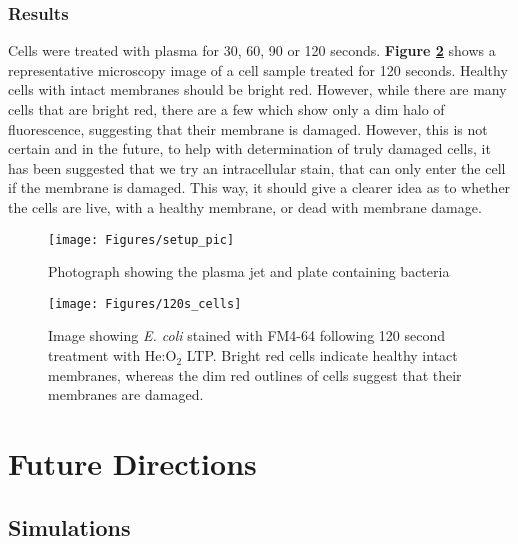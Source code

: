 \documentclass[11pt, oneside]{article}   	%
\newcommand{\todo}[1]{ \textcolor{red}{\bf{To Do:} #1}}
\begin{document}
\subsubsection{Results}
Cells were treated with plasma for 30, 60, 90 or 120 seconds.
\textbf{Figure \ref{fig:results}} shows a representative microscopy image of a cell sample treated for 120 seconds.
Healthy cells with intact membranes should be bright red.
However, while there are many cells that are bright red, there are a few which show only a dim halo of fluorescence, suggesting that their membrane is damaged.
However, this is not certain and in the future, to help with determination of truly damaged cells, it has been suggested that we try an intracellular stain, that can only enter the cell if the membrane is damaged.
This way, it should give a clearer idea as to whether the cells are live, with a healthy membrane, or dead with membrane damage.






\begin{figure}
\centering
\texttt{[image: Figures/setup\_pic]}
\caption{Photograph showing the plasma jet and plate containing bacteria}
\label{fig:setup_pic}
\end{figure}

\begin{figure}
\centering
\texttt{[image: Figures/120s\_cells]}
\caption{Image showing \textit{E. coli} stained with FM4-64 following 120 second treatment with He:O$_2$ LTP. Bright red cells indicate healthy intact membranes, whereas the dim red outlines of cells suggest that their membranes are damaged.}
\label{fig:results}
\end{figure}


\section{Future Directions}

\subsection{Simulations}
\end{document}
